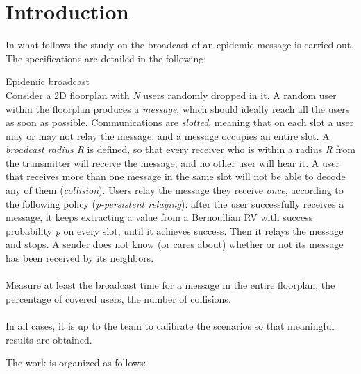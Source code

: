 %
\chapter{Introduction}
In what follows the study on the broadcast of an epidemic message is carried
out.\\
The specifications are detailed in the following:
\begin{displayquote}
    \begin{specifications}
    {\Large Epidemic broadcast}\\
    Consider a 2D floorplan with \textit{N} users randomly dropped in it. A
    random user within the floorplan produces a \textit{message}, which should
    ideally reach all the users as soon as possible. Communications are
    \textit{slotted}, meaning that on each slot a user may or may not relay the
    message, and a message occupies an entire slot. A \textit{broadcast radius
    R} is defined, so that every receiver who is within a radius \textit{R} from
    the transmitter will receive the message, and no other user will hear it. A
    user that receives more than one message in the same slot will not be able
    to decode any of them (\textit{collision}). Users relay the message they
    receive \textit{once}, according to the following policy
    (\textit{p-persistent relaying}): after the user successfully receives a
    message, it keeps extracting a value from a Bernoullian RV with success
    probability \textit{p} on every slot, until it achieves success. Then it
    relays the message and stops. A sender does not know (or cares about)
    whether or not its message has been received by its neighbors.\\
    \\
    Measure at least the broadcast time for a message in the entire floorplan,
    the percentage of covered users, the number of collisions.\\
    \\
    In all cases, it is up to the team to calibrate the scenarios so that
    meaningful results are obtained.
    \end{specifications}
\end{displayquote}
The work is organized as follows:
